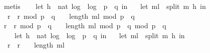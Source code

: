 \begin{isabellebody}
\ metis\isanewline
\isanewline
\ \ \isamarkupfalse%
\ {\isachardoublequoteopen}{\isacharbrackleft}{\kern0pt}{\isacharparenleft}{\kern0pt}let\ h\ {\isacharequal}{\kern0pt}\ nat\ {\isasymlfloor}log\ {}\ {\isacharparenleft}{\kern0pt}log\ {}\ {\isacharparenleft}{\kern0pt}p\ {\isacharasterisk}{\kern0pt}\ q{\isacharparenright}{\kern0pt}{\isacharparenright}{\kern0pt}{\isasymrfloor}\ in\ \isanewline
\ \ let\ m{\isacharunderscore}{\kern0pt}l\ {\isacharequal}{\kern0pt}\ split\ m\ h\ in\ \ \isanewline
\ \ {\isacharparenleft}{\kern0pt}{\isacharparenleft}{\kern0pt}{\isacharparenleft}{\kern0pt}{\isacharparenleft}{\kern0pt}r\ {\isacharasterisk}{\kern0pt}\ r{\isacharparenright}{\kern0pt}\ mod\ {\isacharparenleft}{\kern0pt}p\ {\isacharasterisk}{\kern0pt}\ q{\isacharparenright}{\kern0pt}{\isacharparenright}{\kern0pt}\ {\isacharcircum}{\kern0pt}\ {\isacharparenleft}{\kern0pt}{}\ {\isacharcircum}{\kern0pt}\ {\isacharparenleft}{\kern0pt}length\ m{\isacharunderscore}{\kern0pt}l{\isacharparenright}{\kern0pt}{\isacharparenright}{\kern0pt}\ mod\ {\isacharparenleft}{\kern0pt}p\ {\isacharasterisk}{\kern0pt}\ q{\isacharparenright}{\kern0pt}{\isacharparenright}{\kern0pt}\ \isanewline
{\isacharasterisk}{\kern0pt}\ {\isacharparenleft}{\kern0pt}{\isacharparenleft}{\kern0pt}{\isacharparenleft}{\kern0pt}r\ {\isacharasterisk}{\kern0pt}\ r{\isacharparenright}{\kern0pt}\ mod\ {\isacharparenleft}{\kern0pt}p\ {\isacharasterisk}{\kern0pt}\ q{\isacharparenright}{\kern0pt}{\isacharparenright}{\kern0pt}\ {\isacharcircum}{\kern0pt}\ {\isacharparenleft}{\kern0pt}{}\ {\isacharcircum}{\kern0pt}\ {\isacharparenleft}{\kern0pt}length\ m{\isacharunderscore}{\kern0pt}l{\isacharparenright}{\kern0pt}{\isacharparenright}{\kern0pt}\ mod\ {\isacharparenleft}{\kern0pt}p\ {\isacharasterisk}{\kern0pt}\ q{\isacharparenright}{\kern0pt}{\isacharparenright}{\kern0pt}{\isacharparenright}{\kern0pt}{\isacharparenright}{\kern0pt}\ mod\ {\isacharparenleft}{\kern0pt}p\ {\isacharasterisk}{\kern0pt}\ q{\isacharparenright}{\kern0pt}\isanewline
\ \ \ {\isacharequal}{\kern0pt}\ {\isacharparenleft}{\kern0pt}let\ h\ {\isacharequal}{\kern0pt}\ nat\ {\isasymlfloor}log\ {}\ {\isacharparenleft}{\kern0pt}log\ {}\ {\isacharparenleft}{\kern0pt}p\ {\isacharasterisk}{\kern0pt}\ q{\isacharparenright}{\kern0pt}{\isacharparenright}{\kern0pt}{\isasymrfloor}\ in\ \isanewline
\ \ let\ m{\isacharunderscore}{\kern0pt}l\ {\isacharequal}{\kern0pt}\ split\ m\ h\ in\ \ \isanewline
\ \ {\isacharparenleft}{\kern0pt}r\ {\isacharasterisk}{\kern0pt}\ r{\isacharparenright}{\kern0pt}\ {\isacharcircum}{\kern0pt}\ {\isacharparenleft}{\kern0pt}{}\ {\isacharcircum}{\kern0pt}\ {\isacharparenleft}{\kern0pt}length\ m{\isacharunderscore}{\kern0pt}l{\isacharparenright}{\kern0pt}{\isacharparenright}{\kern0pt}\isanewline

\end{isabellebody}
